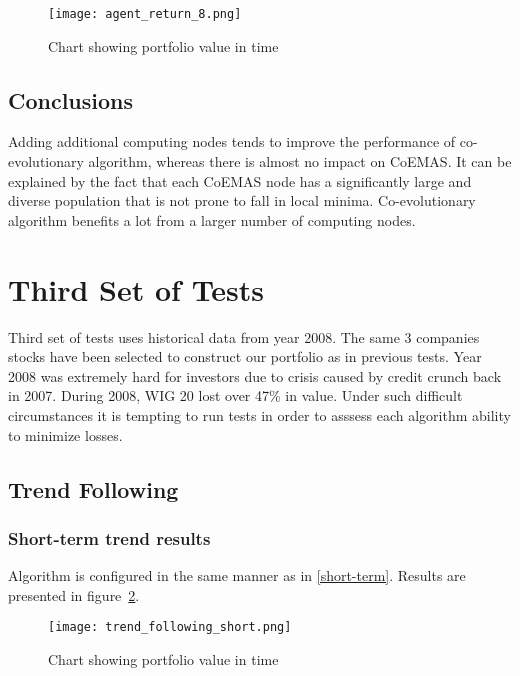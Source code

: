 \begin{figure}[ht]
  \begin{center}
    \texttt{[image: agent\_return\_8.png]}
  \end{center}
  \caption{Chart showing portfolio value in time}
  \label{fig:agent_8_return}
\end{figure}

\subsection{Conclusions}

Adding additional computing nodes tends to improve the performance of co-evolutionary algorithm, whereas there is almost no impact on CoEMAS.
It can be explained by the fact that each CoEMAS node has a significantly large and diverse population that is not prone to fall in local minima.
Co-evolutionary algorithm benefits a lot from a larger number of computing nodes.  

\section{Third Set of Tests}

Third set of tests uses historical data from year 2008.
The same 3 companies stocks have been selected to construct our portfolio as in previous tests.
Year 2008 was extremely hard for investors due to crisis caused by credit crunch back in 2007.
During 2008, WIG 20 lost over 47\% in value.
Under such difficult circumstances it is tempting to run tests in order to asssess each algorithm ability to minimize losses.

\subsection{Trend Following}

\subsubsection{Short-term trend results}

Algorithm is configured in the same manner as in \ref{short-term}.
Results are presented in figure~\ref{fig:trend_foll_short}.

\begin{figure}[ht]
  \begin{center}
    \texttt{[image: trend\_following\_short.png]}
  \end{center}
  \caption{Chart showing portfolio value in time}
  \label{fig:trend_foll_short}
\end{figure}


